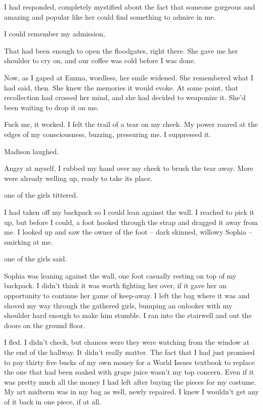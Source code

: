  I had responded, completely mystified about the fact that someone gorgeous and amazing and popular like her could find something to admire in me.


I could remember my admission, 

That had been enough to open the floodgates, right there. She gave me her shoulder to cry on, and our coffee was cold before I was done.

Now, as I gaped at Emma, wordless, her smile widened. She remembered what I had said, then. She knew the memories it would evoke. At some point, that recollection had crossed her mind, and she had decided to weaponize it. She'd been waiting to drop it on me.

Fuck me, it worked. I felt the trail of a tear on my cheek. My power roared at the edges of my consciousness, buzzing, pressuring me. I suppressed it.

 Madison laughed.

Angry at myself, I rubbed my hand over my cheek to brush the tear away. More were already welling up, ready to take its place.

 one of the girls tittered.

I had taken off my backpack so I could lean against the wall. I reached to pick it up, but before I could, a foot hooked through the strap and dragged it away from me. I looked up and saw the owner of the foot -- dark skinned, willowy Sophia -- smirking at me.

 one of the girls said.

Sophia was leaning against the wall, one foot casually resting on top of my backpack. I didn't think it was worth fighting her over, if it gave her an opportunity to continue her game of keep-away. I left the bag where it was and shoved my way through the gathered girls, bumping an onlooker with my shoulder hard enough to make him stumble. I ran into the stairwell and out the doors on the ground floor.

I fled. I didn't check, but chances were they were watching from the window at the end of the hallway. It didn't really matter. The fact that I had just promised to pay thirty five bucks of my own money for a World Issues textbook to replace the one that had been soaked with grape juice wasn't my top concern. Even if it was pretty much all the money I had left after buying the pieces for my costume. My art midterm was in my bag as well, newly repaired. I knew I wouldn't get any of it back in one piece, if at all.


